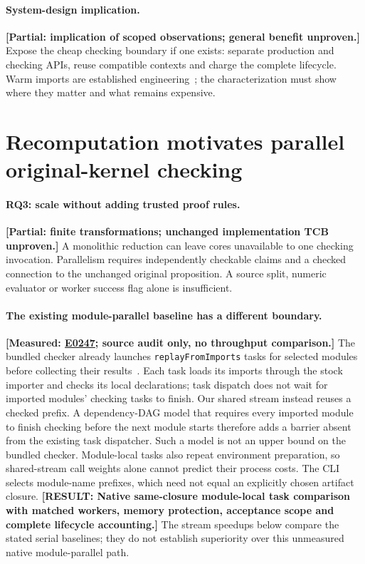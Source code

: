 \documentclass[10pt,twocolumn]{article}
\newcommand{\missing}[1]{\textbf{[RESULT: #1]}}
\newcommand{\measured}[1]{\textbf{[Measured: #1]}}
\newcommand{\partialev}[1]{\textbf{[Partial: #1]}}
\newcommand{\expref}[2]{\href{https://github.com/yunwei37/proofserve/blob/main/docs/tmp/build-and-evaluate/step-#1/step-report.md}{E#2}}
\begin{document}
\paragraph{System-design implication.}
\partialev{implication of scoped observations; general benefit unproven.}
Expose the cheap checking boundary if one exists: separate production and
checking APIs, reuse compatible contexts and charge the complete lifecycle.
Warm imports are established engineering~\cite{kimina,kiminaPaper};
the characterization must show where they matter and what remains expensive.

\section{Recomputation motivates parallel original-kernel checking}
\label{sec:chunked}
\paragraph{RQ3: scale without adding trusted proof rules.}
\partialev{finite transformations; unchanged implementation TCB unproven.}
A monolithic reduction can leave cores unavailable to one checking invocation.
Parallelism requires independently checkable claims and a checked connection
to the unchanged original proposition.
A source split, numeric evaluator or worker success flag alone is insufficient.

\paragraph{The existing module-parallel baseline has a different boundary.}
\measured{\expref{0247-20261101T131749+0000}{0247}; source audit only, no throughput comparison.}
The bundled checker already launches \texttt{replayFromImports} tasks for
selected modules before collecting their results~\cite{lean434CheckerSource2026}.
Each task loads its imports through the stock importer and checks its local
declarations; task dispatch does not wait for imported modules' checking
tasks to finish.
Our shared stream instead reuses a checked prefix.
A dependency-DAG model that requires every imported module to finish checking
before the next module starts therefore adds a barrier absent from the
existing task dispatcher.
Such a model is not an upper bound on the bundled checker.
Module-local tasks also repeat environment preparation, so shared-stream
call weights alone cannot predict their process costs.
The CLI selects module-name prefixes, which need not equal an explicitly
chosen artifact closure.
\missing{Native same-closure module-local task comparison with matched workers,
memory protection, acceptance scope and complete lifecycle accounting.}
The stream speedups below compare the stated serial baselines; they do not
establish superiority over this unmeasured native module-parallel path.
\end{document}
